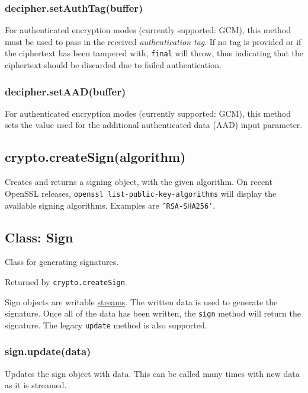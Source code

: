\subsubsection{decipher.setAuthTag(buffer)}\label{decipher.setauthtagbuffer}

For authenticated encryption modes (currently supported: GCM), this
method must be used to pass in the received \emph{authentication tag}.
If no tag is provided or if the ciphertext has been tampered with,
\texttt{final} will throw, thus indicating that the ciphertext should be
discarded due to failed authentication.

\subsubsection{decipher.setAAD(buffer)}\label{decipher.setaadbuffer}

For authenticated encryption modes (currently supported: GCM), this
method sets the value used for the additional authenticated data (AAD)
input parameter.

\subsection{crypto.createSign(algorithm)}\label{crypto.createsignalgorithm}

Creates and returns a signing object, with the given algorithm. On
recent OpenSSL releases, \texttt{openssl list-public-key-algorithms}
will display the available signing algorithms. Examples are
\texttt{'RSA-SHA256'}.

\subsection{Class: Sign}\label{class-sign}

Class for generating signatures.

Returned by \texttt{crypto.createSign}.

Sign objects are writable \href{stream.html}{streams}. The written data
is used to generate the signature. Once all of the data has been
written, the \texttt{sign} method will return the signature. The legacy
\texttt{update} method is also supported.

\subsubsection{sign.update(data)}\label{sign.updatedata}

Updates the sign object with data. This can be called many times with
new data as it is streamed.

